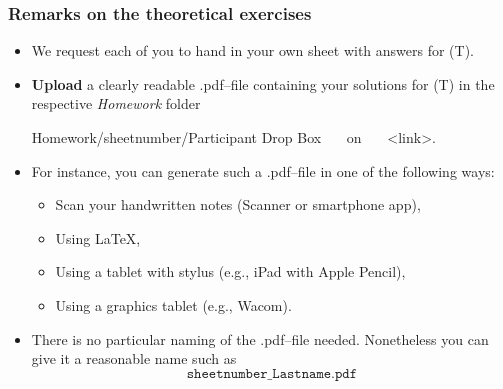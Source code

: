 \documentclass{article}
\def\exerciseUploadRep{<link>}
\begin{document}
\subsubsection{Remarks on the theoretical exercises}
\begin{itemize}
	\item We request each of you to hand in your own sheet with answers for (T).
	\item \textbf{Upload} a clearly readable .pdf--file containing your solutions for (T) in the respective \textit{Homework} folder 
	\begin{center}
		Homework/sheetnumber/Participant Drop Box ~~~on~~~ \exerciseUploadRep.
	\end{center}
     \item For instance, you can generate such a .pdf--file in one of the following ways:
	\begin{itemize}
		\item Scan your handwritten notes (Scanner or smartphone app),
		\item Using \LaTeX,
		\item Using a tablet with stylus (e.g., iPad with Apple Pencil),
		\item Using a graphics tablet (e.g., Wacom).
	\end{itemize}
	\item There is no particular naming of the .pdf--file needed. Nonetheless you can give it a reasonable name such as $$\texttt{sheetnumber\_Lastname.pdf}$$
\end{itemize}
\end{document}
